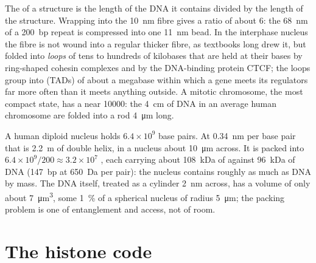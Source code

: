 \begin{proposition}\label{prop:b3:chromatin-epigenetics:compaction}
The \emph{} of a  structure is the length of the
DNA it contains divided by the length of the structure. Wrapping into
the \qty{10}{nm} fibre gives a ratio of about $6$: the \qty{68}{nm} of a
\qty{200}{bp} repeat is compressed into one \qty{11}{nm} bead. In the
interphase nucleus the fibre is not wound into a regular thicker fibre,
as textbooks long drew it, but folded into \emph{loops} of tens to
hundreds of kilobases that are held at their bases by ring-shaped
cohesin complexes and by the DNA-binding protein CTCF; the loops group
into \emph{} (TADs) of about a
megabase within which a gene meets its regulators far more often than
it meets anything outside. A mitotic chromosome, the most compact
state, has a  near \num{10000}: the \qty{4}{cm} of DNA in
an average human chromosome are folded into a rod \qty{4}{\micro m}
long.
\end{proposition}

\begin{example}\label{ex:b3:chromatin-epigenetics:two-metres}
A human diploid nucleus holds $6.4\times 10^{9}$ base pairs. At
\qty{0.34}{nm} per base pair that is \qty{2.2}{m} of double helix, in a
nucleus about \qty{10}{\micro m} across. It is packed into
$6.4\times 10^{9}/200 \approx 3.2\times 10^{7}$ , each
carrying about \qty{108}{kDa} of  against \qty{96}{kDa} of DNA
(\qty{147}{bp} at \qty{650}{Da} per pair): the nucleus contains roughly
as much  as DNA by mass. The DNA itself, treated as a cylinder
\qty{2}{nm} across, has a volume of only about \qty{7}{\micro m^3},
some \qty{1}{\%} of a spherical nucleus of radius \qty{5}{\micro m};
the packing problem is one of entanglement and access, not of room.
\end{example}

\section{The histone code}

